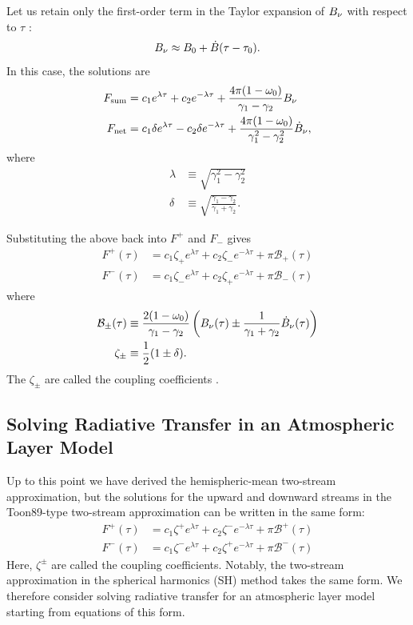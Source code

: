 Let us retain only the first-order term in the Taylor expansion of $B_\nu$ with respect to $\tau$ \cite{1989JGR....9416287T} \cite{heng2017exoplanetary}:
\begin{align}
B_\nu \approx B_0 + \dot{B} (\tau - \tau_0).
\end{align}
In this case, the solutions are
\begin{align}
F_\mathrm{sum} &= c_1 e^{\lambda \tau} + c_2 e^{-\lambda \tau} +\frac{ 4 \pi (1-\omega_0)}{\gamma_1 - \gamma_2} B_\nu \\
F_\mathrm{net} &= c_1 \delta e^{\lambda \tau} - c_2 \delta e^{-\lambda \tau} +\frac{ 4 \pi (1-\omega_0)}{\gamma_1^2 - \gamma_2^2} \dot{B}_\nu,
\end{align}
where
\begin{align}
\lambda &\equiv\sqrt{\gamma_1^2-\gamma_2^2} \\
\delta &\equiv\sqrt{\frac{\gamma_1 - \gamma_2}{\gamma_1 + \gamma_2}}.
\end{align}

Substituting the above back into $F^+$ and $F_-$ gives
\begin{align}
F^+ (\tau) &= c_1 \zeta_+ e^{\lambda \tau} + c_2 \zeta_- e^{-\lambda \tau} + \pi \mathcal{B}_+ (\tau)  \\
F^- (\tau) &= c_1 \zeta_- e^{\lambda \tau} + c_2 \zeta_+ e^{-\lambda \tau} + \pi \mathcal{B}_- (\tau)
\end{align}
where
\begin{align}
 \mathcal{B}_\pm(\tau) &\equiv\frac{ 2 (1-\omega_0)}{\gamma_1 - \gamma_2} \left( B_\nu(\tau) \pm \frac{1}{\gamma_1 + \gamma_2} \dot{B}_\nu (\tau) \right) \\
 \zeta_\pm &\equiv\frac{1}{2} (1 \pm \delta).
\end{align}
The $\zeta_\pm$ are called the coupling coefficients \cite{heng2017exoplanetary}. \\
\subsection*{Solving Radiative Transfer in an Atmospheric Layer Model}

Up to this point we have derived the hemispheric-mean two-stream approximation, but the solutions for the upward and downward streams in the Toon89-type two-stream approximation can be written in the same form:
\begin{align}
\label{eq:2stream_1}
F^+ (\tau) &= c_1 \zeta^+ e^{\lambda \tau} + c_2 \zeta^- e^{-\lambda \tau} + \pi \mathcal{B}^+ (\tau)  \\
\label{eq:2stream_2}
F^- (\tau) &= c_1 \zeta^- e^{\lambda \tau} + c_2 \zeta^+ e^{-\lambda \tau} + \pi \mathcal{B}^- (\tau)
\end{align}
Here, $\zeta^\pm$ are called the coupling coefficients. Notably, the two-stream approximation in the spherical harmonics (SH) method takes the same form. We therefore consider solving radiative transfer for an atmospheric layer model starting from equations of this form.

